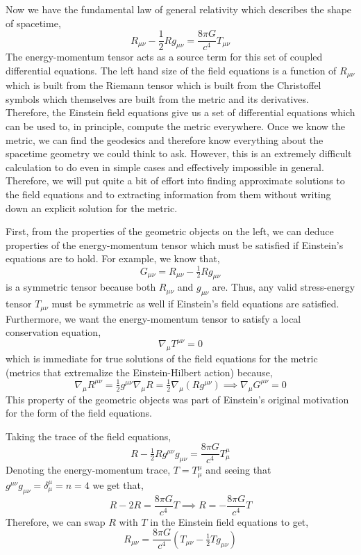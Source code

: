 \documentclass[11pt, a4paper]{article}
\begin{document}
Now we have the fundamental law of general relativity which describes the shape of spacetime,
\[ R_{\mu \nu}  - \frac{1}{2} R g_{\mu \nu} = \frac{8\pi G}{c^4} T_{\mu \nu}\] 
The energy-momentum tensor acts as a source term for this set of coupled differential equations. The left hand size of the field equations is a function of $R_{\mu \nu}$ which is built from the Riemann tensor which is built from the Christoffel symbols which themselves are built from the metric and its derivatives. Therefore, the Einstein field equations give us a set of differential equations which can be used to, in principle, compute the metric everywhere. Once we know the metric, we can find the geodesics and therefore know everything about the spacetime geometry we could think to ask. However, this is an extremely difficult calculation to do even in simple cases and effectively impossible in general. Therefore, we will put quite a bit of effort into finding approximate solutions to the field equations and to extracting information from them without writing down an explicit solution for the metric. 
\par
First, from the properties of the geometric objects on the left, we can deduce properties of the energy-momentum tensor which must be satisfied if Einstein's equations are to hold. For example, we know that,
\[G_{\mu \nu} = R_{\mu \nu} - \tfrac{1}{2} R g_{\mu \nu} \]
is a symmetric tensor because both $R_{\mu \nu}$ and $g_{\mu \nu}$ are. Thus, any valid stress-energy tensor $T_{\mu \nu}$ must be symmetric as well if Einstein's field equations are satisfied. Furthermore, we want the energy-momentum tensor to satisfy a local conservation equation,
\[ \nabla_{\mu} T^{\mu \nu} = 0 \]
which is immediate for true solutions of the field equations for the metric (metrics that extremalize the Einstein-Hilbert action) because,
\[ \nabla_\mu R^{\mu \nu} = \tfrac{1}{2} g^{\mu \nu} \nabla_\mu R = \tfrac{1}{2} \nabla_\mu (R g^{\mu \nu}) \implies \nabla_\mu G^{\mu \nu} = 0\]
This property of the geometric objects was part of Einstein's original motivation for the form of the field equations. 
\par 
Taking the trace of the field equations,
\[ R - \tfrac{1}{2} R g^{\mu \nu} g_{\mu \nu} = \frac{8 \pi G}{c^4} T^{\mu}_{\mu} \]
Denoting the energy-momentum trace, $T = T^{\mu}_{\mu}$ and seeing that $g^{\mu \nu} g_{\mu \nu} = \delta^\mu_{\mu} = n = 4$ we get that,
\[ R - 2 R = \frac{8 \pi G}{c^4} T \implies R = - \frac{8 \pi G}{c^4} T \]
Therefore, we can swap $R$ with $T$ in the Einstein field equations to get,
\[ R_{\mu \nu} = \frac{8 \pi G}{c^4} (T_{\mu \nu} - \tfrac{1}{2} T g_{\mu \nu}) \]
\end{document}
